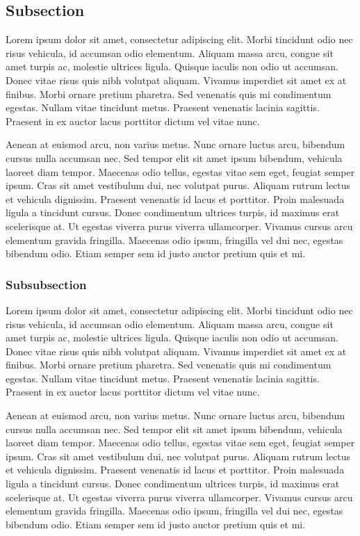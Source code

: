 \documentclass[twocolumn]{miniclass}
\begin{document}
\subsection{Subsection}
Lorem ipsum dolor sit amet, consectetur adipiscing elit. Morbi tincidunt odio nec risus vehicula, id accumsan odio elementum. Aliquam massa arcu, congue sit amet turpis ac, molestie ultrices ligula. Quisque iaculis non odio ut accumsan. Donec vitae risus quis nibh volutpat aliquam. Vivamus imperdiet sit amet ex at finibus. Morbi ornare pretium pharetra. Sed venenatis quis mi condimentum egestas. Nullam vitae tincidunt metus. Praesent venenatis lacinia sagittis. Praesent in ex auctor lacus porttitor dictum vel vitae nunc.

Aenean at euismod arcu, non varius metus. Nunc ornare luctus arcu, bibendum cursus nulla accumsan nec. Sed tempor elit sit amet ipsum bibendum, vehicula laoreet diam tempor. Maecenas odio tellus, egestas vitae sem eget, feugiat semper ipsum. Cras sit amet vestibulum dui, nec volutpat purus. Aliquam rutrum lectus et vehicula dignissim. Praesent venenatis id lacus et porttitor. Proin malesuada ligula a tincidunt cursus. Donec condimentum ultrices turpis, id maximus erat scelerisque at. Ut egestas viverra purus viverra ullamcorper. Vivamus cursus arcu elementum gravida fringilla. Maecenas odio ipsum, fringilla vel dui nec, egestas bibendum odio. Etiam semper sem id justo auctor pretium quis et mi.

\subsubsection{Subsubsection}
Lorem ipsum dolor sit amet, consectetur adipiscing elit. Morbi tincidunt odio nec risus vehicula, id accumsan odio elementum. Aliquam massa arcu, congue sit amet turpis ac, molestie ultrices ligula. Quisque iaculis non odio ut accumsan. Donec vitae risus quis nibh volutpat aliquam. Vivamus imperdiet sit amet ex at finibus. Morbi ornare pretium pharetra. Sed venenatis quis mi condimentum egestas. Nullam vitae tincidunt metus. Praesent venenatis lacinia sagittis. Praesent in ex auctor lacus porttitor dictum vel vitae nunc.

Aenean at euismod arcu, non varius metus. Nunc ornare luctus arcu, bibendum cursus nulla accumsan nec. Sed tempor elit sit amet ipsum bibendum, vehicula laoreet diam tempor. Maecenas odio tellus, egestas vitae sem eget, feugiat semper ipsum. Cras sit amet vestibulum dui, nec volutpat purus. Aliquam rutrum lectus et vehicula dignissim. Praesent venenatis id lacus et porttitor. Proin malesuada ligula a tincidunt cursus. Donec condimentum ultrices turpis, id maximus erat scelerisque at. Ut egestas viverra purus viverra ullamcorper. Vivamus cursus arcu elementum gravida fringilla. Maecenas odio ipsum, fringilla vel dui nec, egestas bibendum odio. Etiam semper sem id justo auctor pretium quis et mi.
\end{document}
